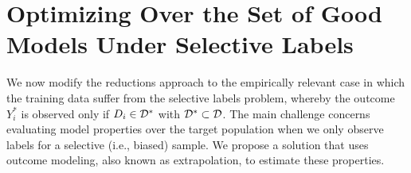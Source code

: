 \documentclass{article}
\begin{document}
\section{Optimizing Over the Set of Good Models Under Selective Labels} \label{section: selective labels}

We now modify the reductions approach to the empirically relevant case in which the training data suffer from the selective labels problem, whereby the outcome $Y_i^*$ is observed only if $D_i \in \mathcal{D}^*$ with $\mathcal{D}^* \subset \mathcal{D}$.
The main challenge concerns evaluating model properties over the target population when we only observe labels for a selective (i.e., biased) sample.
We propose a solution that uses outcome modeling, also known as extrapolation, to estimate these properties.
\end{document}

